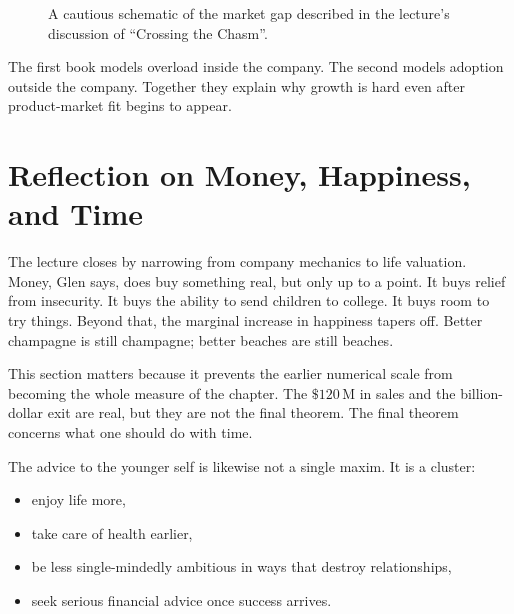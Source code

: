 \begin{figure}[h]
\centering
{}
\caption{A cautious schematic of the market gap described in the lecture's discussion of ``Crossing the Chasm''.}
\end{figure}

The first book models overload inside the company. The second models adoption outside the company. Together they explain why growth is hard even after product-market fit begins to appear.

\section{Reflection on Money, Happiness, and Time}

The lecture closes by narrowing from company mechanics to life valuation. Money, Glen says, does buy something real, but only up to a point. It buys relief from insecurity. It buys the ability to send children to college. It buys room to try things. Beyond that, the marginal increase in happiness tapers off. Better champagne is still champagne; better beaches are still beaches.

This section matters because it prevents the earlier numerical scale from becoming the whole measure of the chapter. The \(\$120\,\mathrm{M}\) in sales and the billion-dollar exit are real, but they are not the final theorem. The final theorem concerns what one should do with time.

The advice to the younger self is likewise not a single maxim. It is a cluster:
\begin{itemize}
\item enjoy life more,
\item take care of health earlier,
\item be less single-mindedly ambitious in ways that destroy relationships,
\item seek serious financial advice once success arrives.
\end{itemize}

